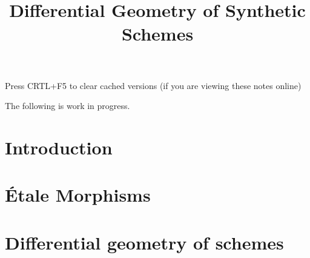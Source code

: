 \documentclass{../util/zariski}
\title{Differential Geometry of Synthetic Schemes}
\begin{document}
\maketitle

\begin{center}
  \color{purple}
  \large{Press CRTL+F5 to clear cached versions}
  \large{(if you are viewing these notes online)}
\end{center}

The following is work in progress.

\tableofcontents

\section*{Introduction}


\section{Étale Morphisms}


\section{Differential geometry of schemes}


\printindex

\printbibliography
\end{document}

